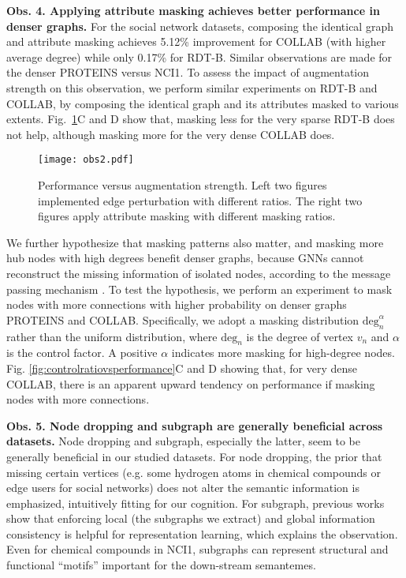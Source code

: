 \textbf{Obs. 4. Applying attribute masking achieves better performance in denser graphs.} For the social network datasets, composing the identical graph and attribute masking achieves 5.12\% improvement for COLLAB (with higher average degree) while only 0.17\% for RDT-B.
Similar observations are made for the denser PROTEINS versus NCI1.  To assess the impact of augmentation strength on this observation, we perform similar experiments on RDT-B and COLLAB, by composing the identical graph and its attributes masked to various extents.  Fig.~\ref{fig:ratiovsperformance}C and D show that, masking less for the very sparse RDT-B does not help, although masking more for the very dense COLLAB does.  

\begin{figure}[!htb] 
    \centering 
    \texttt{[image: obs2.pdf]}
    \caption{\small{Performance versus augmentation strength. Left two figures implemented edge perturbation with different ratios. The right two figures apply attribute masking with different masking ratios.}}
    \vspace{-0.5em}
    \label{fig:ratiovsperformance} 
\end{figure} %

We further hypothesize that masking patterns also matter, and masking more hub nodes with high degrees benefit denser graphs, because GNNs cannot reconstruct the missing information of isolated nodes, 
according to the message passing mechanism \cite{gilmer2017neural}.  To test the hypothesis, we perform an experiment to mask nodes with more connections with higher probability on denser graphs PROTEINS and COLLAB.  Specifically, we adopt a masking distribution $\mathrm{deg}_n^\alpha$ rather than the uniform distribution, where $\mathrm{deg}_n$ is the degree of vertex $v_n$ and $\alpha$ is the control factor. A positive $\alpha$ indicates more masking for high-degree nodes.  Fig. \ref{fig:controlratiovsperformance}C and D 
showing that, for very dense COLLAB, there is an apparent upward tendency on performance if masking nodes with more connections.  

\textbf{Obs. 5. Node dropping and subgraph are generally beneficial across datasets.}
Node dropping and subgraph, especially the latter, seem to be generally beneficial in our studied datasets.
For node dropping, the prior that missing certain vertices (e.g. some  hydrogen atoms in chemical compounds or edge users for social networks) does not alter the semantic information is emphasized,
intuitively fitting for our cognition.  
For subgraph, previous works \cite{velivckovic2018deep,sun2019infograph} show that enforcing local (the subgraphs we extract) and global information consistency is helpful for representation learning, which explains the observation. Even for chemical compounds in NCI1, subgraphs can represent structural and functional ``motifs'' important for the down-stream semantemes.   

